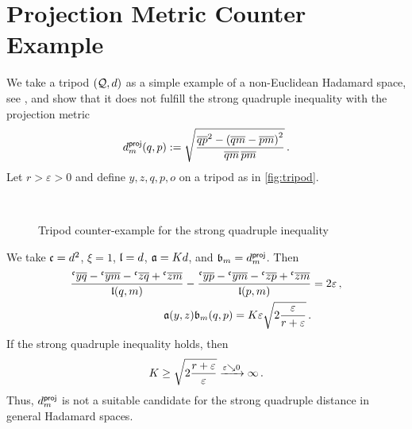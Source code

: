\section{Projection Metric Counter Example} \label{app:dproj}
%
We take a tripod $(\mathcal{Q}, d)$ as a simple example of a non-Euclidean Hadamard space, see \cite[Example 3.2]{sturm03}, and show that it does not fulfill the strong quadruple inequality with the projection metric 
\begin{equation*}
	d_{m}^{\mathsf{proj}}(q,p) := \sqrt{\frac{\overline{qp}^2 - \left( \overline{qm} - \overline{pm} \right)^2}{\overline{qm}\, \overline{pm}}}
	\, .
\end{equation*}  
%
Let $r > \varepsilon > 0$ and define $y,z,q,p,o$ on a tripod as in \autoref{fig:tripod}.
%
\begin{figure}
	\begin{center}
	\\
	\caption{Tripod counter-example for the strong quadruple inequality}
	\label{fig:tripod}
	\end{center}
\end{figure}
%
We take $\mathfrak{c} = d^2$, $\xi=1$, $\mathfrak{l} = d$, $\mathfrak{a} = K d$, and $\mathfrak{b}_m = d_{m}^{\mathsf{proj}}$.
Then 
\begin{align*}
	\frac{\olc yq - \olc ym - \olc zq + \olc zm}{\mf l(q,m)}
	-
	\frac{\olc yp - \olc ym - \olc zp + \olc zm}{\mf l(p,m)}
	&=
	2 \varepsilon\eqcm
	\\
	\mf a(y,z) \mf b_m(q,p) = K \varepsilon \sqrt{2\frac{\varepsilon}{r+\varepsilon}}
	\eqfs
\end{align*}
If the strong quadruple inequality holds, then
\begin{equation*}
	K  \geq \sqrt{2\frac{r+\varepsilon}{\varepsilon}} \xrightarrow{\varepsilon\searrow0} \infty
	\, .
\end{equation*}
Thus, $d_{m}^{\mathsf{proj}}$ is not a suitable candidate for the strong quadruple distance in general Hadamard spaces.
%
%
%
%
